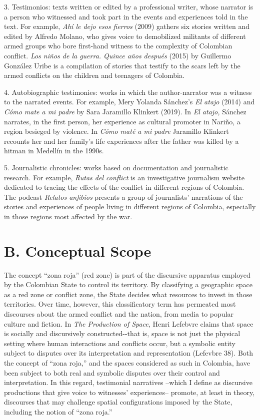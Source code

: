 \documentclass[
  11pt,
,
onecolumn,
openany
]{book}
\begin{document}
3. Testimonios: texts written or edited by a professional writer, whose
narrator is a person who witnessed and took part in the events and experiences
told in the text. For example, \emph{Ahí le dejo esos fierros} (2009) gathers
six stories written and edited by Alfredo Molano, who gives voice to
demobilized militants of different armed groups who bore first-hand witness to
the complexity of Colombian conflict. \emph{Los niños de la guerra. Quince
años después} (2015) by Guillermo González Uribe is a compilation of stories
that testify to the scars left by the armed conflicts on the children and
teenagers of Colombia.

4. Autobiographic testimonies: works in which the author-narrator was a
witness to the narrated events. For example, Mery Yolanda Sánchez's \emph{El
atajo} (2014) and \emph{Cómo mate a mi padre} by Sara Jaramillo Klinkert
(2019). In \emph{El atajo,} Sánchez narrates, in the first person, her
experience as cultural promoter in Nariño, a region besieged by violence. In
\emph{Cómo maté a mi padre} Jaramillo Klinkert recounts her and her family's
life experiences after the father was killed by a hitman in Medellín in the
1990s.

5. Journalistic chronicles: works based on documentation and journalistic
research. For example, \emph{Rutas del conflict} is an investigative
journalism website dedicated to tracing the effects of the conflict in
different regions of Colombia. The podcast \emph{Relatos anfibios} presents a
group of journalists' narrations of the stories and experiences of people
living in different regions of Colombia, especially in those regions most
affected by the war.

\hypertarget{b.-conceptual-scope}{%
\section{B. Conceptual Scope}\label{b.-conceptual-scope}}

The concept ``zona roja'' (red zone) is part of the discursive apparatus
employed by the Colombian State to control its territory. By classifying a
geographic space as a red zone or conflict zone, the State decides what
resources to invest in those territories. Over time, however, this
classificatory term has permeated most discourses about the armed conflict and
the nation, from media to popular culture and fiction. In \emph{The Production
of Space}, Henri Lefebvre claims that space is socially and discursively
constructed-\/-that is, space is not just the physical setting where human
interactions and conflicts occur, but a symbolic entity subject to disputes
over its interpretation and representation (Lefevbre 38). Both the concept of
``zona roja,'' and the spaces considered as such in Colombia, have been
subject to both real and symbolic disputes over their control and
interpretation. In this regard, testimonial narratives --which I define as
discursive productions that give voice to witnesses' experiences-- promote, at
least in theory, discourses that may challenge spatial configurations imposed
by the State, including the notion of ``zona roja.''
\end{document}
